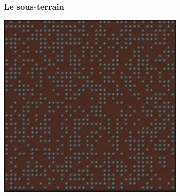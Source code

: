 \documentclass[table]{beamer}
\begin{document}
\begin{frame}
    \frametitle{Le sous-terrain}
    \begin{center}
        \includegraphics[width=0.7\textwidth]{img/under} 
    \end{center}
\end{frame}
\end{document}
